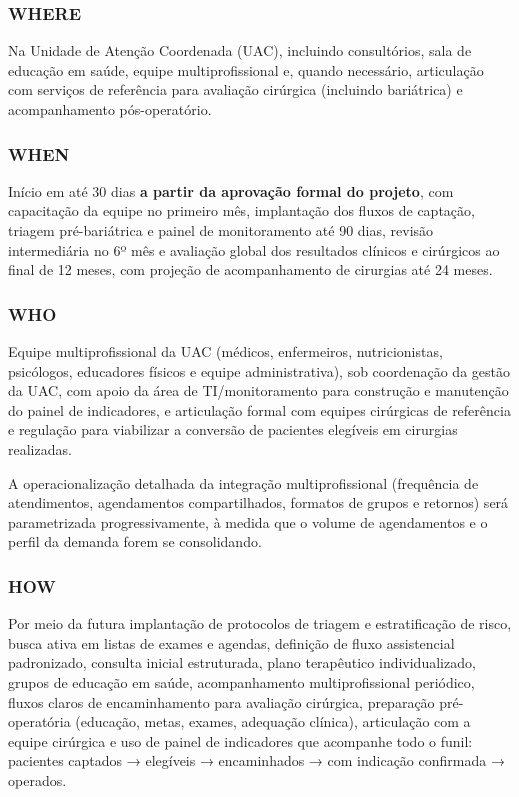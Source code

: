 \documentclass[12pt]{article}
\begin{document}
\subsubsection{WHERE}
\label{sec:org0834fbd}
Na Unidade de Atenção Coordenada (UAC), incluindo consultórios, sala de educação em saúde, equipe multiprofissional e, quando necessário, articulação com serviços de referência para avaliação cirúrgica (incluindo bariátrica) e acompanhamento pós-operatório.

\subsubsection{WHEN}
\label{sec:org3b849c8}
Início em até 30 dias \textbf{a partir da aprovação formal do projeto}, com capacitação da equipe no primeiro mês, implantação dos fluxos de captação, triagem pré-bariátrica e painel de monitoramento até 90 dias, revisão intermediária no 6º mês e avaliação global dos resultados clínicos e cirúrgicos ao final de 12 meses, com projeção de acompanhamento de cirurgias até 24 meses.

\subsubsection{WHO}
\label{sec:orgd4521f9}
Equipe multiprofissional da UAC (médicos, enfermeiros, nutricionistas, psicólogos, educadores físicos e equipe administrativa), sob coordenação da gestão da UAC, com apoio da área de TI/monitoramento para construção e manutenção do painel de indicadores, e articulação formal com equipes cirúrgicas de referência e regulação para viabilizar a conversão de pacientes elegíveis em cirurgias realizadas.

A operacionalização detalhada da integração multiprofissional (frequência de atendimentos, agendamentos compartilhados, formatos de grupos e retornos) será parametrizada progressivamente, à medida que o volume de agendamentos e o perfil da demanda forem se consolidando.

\subsubsection{HOW}
\label{sec:orgb06bd10}
Por meio da futura implantação de protocolos de triagem e estratificação de risco, busca ativa em listas de exames e agendas, definição de fluxo assistencial padronizado, consulta inicial estruturada, plano terapêutico individualizado, grupos de educação em saúde, acompanhamento multiprofissional periódico, fluxos claros de encaminhamento para avaliação cirúrgica, preparação pré-operatória (educação, metas, exames, adequação clínica), articulação com a equipe cirúrgica e uso de painel de indicadores que acompanhe todo o funil: pacientes captados → elegíveis → encaminhados → com indicação confirmada → operados.
\end{document}
